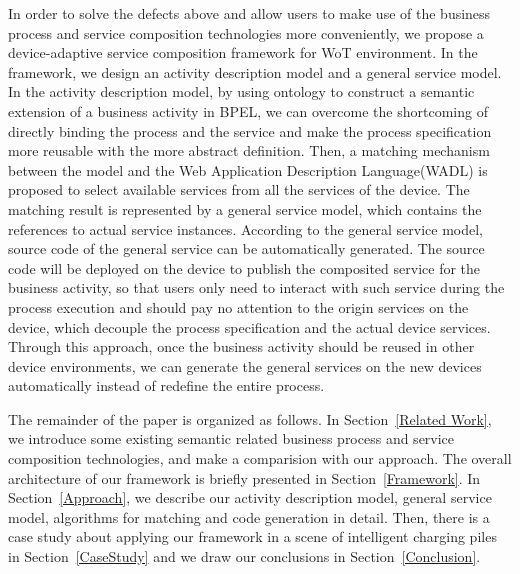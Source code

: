 In order to solve the defects above and allow users to make use of the business process and service composition technologies more conveniently, we propose a device-adaptive service composition framework for WoT environment. In the framework, we design an activity description model and a general service model. In the activity description model, by using ontology to construct a semantic extension of a business activity in BPEL, we can overcome the shortcoming of directly binding the process and the service and  make the process specification more reusable with the more abstract definition. Then, a matching mechanism between the model and the Web Application Description Language(WADL) is proposed to select available services from all the services of the device. The matching result is represented by a general service model, which contains the references to actual service instances. According to the general service model, source code of the general service can be automatically generated. The source code  will be deployed on the device to publish the composited service for the business activity, so that users only need to interact with such service during the process execution and should pay no attention to the origin services on the device, which decouple the process specification and the actual device services. Through this approach, once the business activity should be reused in other device environments, we can generate the general services on the new devices automatically instead of redefine the entire process. 

The remainder of the paper is organized as follows. In Section~\ref{Related Work}, we introduce some existing semantic related business process and service composition technologies, and make a comparision with our approach. The overall architecture of our framework is briefly presented in Section~\ref{Framework}. In Section~\ref{Approach}, we describe our activity description model, general service model, algorithms for matching and code generation in detail. Then, there is a case study about applying our framework in a scene of intelligent charging piles in Section~\ref{CaseStudy} and we draw our conclusions in Section~\ref{Conclusion}. 

